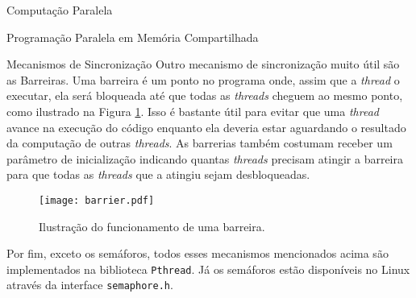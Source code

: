 \begin{section}{Computação Paralela}
\begin{subsection}{Programação Paralela em Memória Compartilhada}
\begin{subsubsection}{Mecanismos de Sincronização}
Outro mecanismo de sincronização muito útil são as Barreiras. Uma barreira
é um ponto no programa onde, assim que a \textit{thread} o executar, ela
será bloqueada até que todas as \textit{threads} cheguem ao mesmo ponto, como
ilustrado na Figura \ref{fig:barrier}.
Isso é bastante útil para evitar que uma \textit{thread} avance na execução
do código enquanto ela deveria estar aguardando o resultado da computação
de outras \textit{threads}. As barrerias também costumam receber um parâmetro
de inicialização indicando quantas \textit{threads} precisam atingir a
barreira para que todas as \textit{threads} que a atingiu sejam desbloqueadas.

\begin{figure}[ht]
 \centering
 \texttt{[image: barrier.pdf]}
 \caption{Ilustração do funcionamento de uma barreira.}
 \label{fig:barrier}
\end{figure}


Por fim, exceto os semáforos, todos esses mecanismos mencionados acima são
implementados na biblioteca \texttt{Pthread}. Já os semáforos estão disponíveis
no Linux através da interface \texttt{semaphore.h}.

\end{subsubsection}


\end{subsection}
\end{section}
